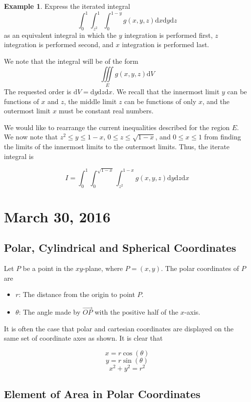 \documentclass[11pt]{article}
\theoremstyle{plain} %
\theoremstyle{definition}
\theoremstyle{example}
\newtheorem*{example}{Example}
\theoremstyle{remark}
\begin{document}
\begin{example}
Express the iterated integral 
$$\int_0^1\int_{z^2}^1\int_0^{1-y}g(x, y, z) \mathrm d x \mathrm d y \mathrm d z$$ as an equivalent integral in which the $y$ integration is performed first, $z$ integration is performed second, and $x$ integration is performed last.
\end{example}

We note that the integral will be of the form $$\iiint\limits_Eg(x, y, z) \mathrm d V$$The requested order is $\mathrm d V = \mathrm d y \mathrm d z \mathrm d x$. We recall that the innermost limit $y$ can be functions of $x$ and $z$, the middle limit $z$ can be functions of only $x$, and the outermost limit $x$ must be constant real numbers.

We would like to rearrange the current inequalities described for the region $E$. We now note that $z^2 \leq y \leq 1-x$, $0 \leq z \leq \sqrt{1-x}$, and $0 \leq x \leq 1$ from finding the limits of the innermost limits to the outermost limits. Thus, the iterate integral is

$$I = \int_0^1\int_0^{\sqrt{1-x}}\int_{z^2}^{1-x} g(x, y, z) \mathrm d y \mathrm d z \mathrm d x$$

\section{March 30, 2016}
\subsection{Polar, Cylindrical and Spherical Coordinates}

Let $P$ be a point in the $xy$-plane, where $P=(x,y)$. The polar coordinates of $P$ are 
\begin{itemize}
	\item $r$: The distance from the origin to point $P$.
	\item $\theta$: The angle made by $\overrightarrow{OP}$ with the positive half of the $x$-axis. 
\end{itemize}

It is often the case that polar and cartesian coordinates are displayed on the same set of coordinate axes as shown. It is clear that 

$$x = r\cos(\theta)$$
$$y = r \sin(\theta)$$
$$x^2+y^2=r^2$$

\subsection{Element of Area in Polar Coordinates}
\end{document}
